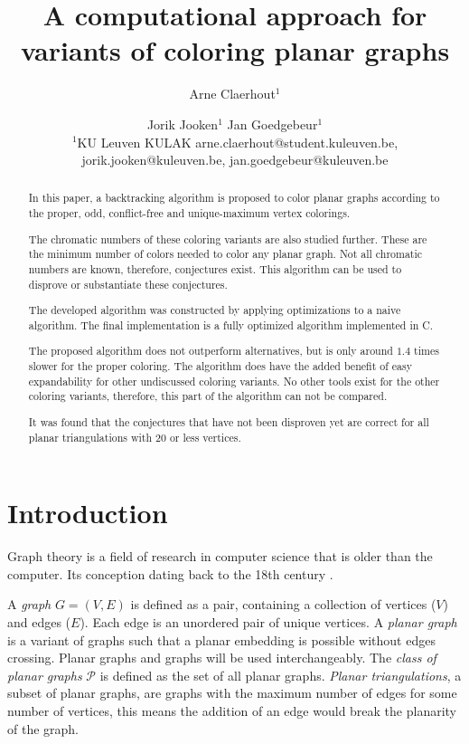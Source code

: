 \documentclass{article}
\title{A computational approach for variants of coloring planar graphs}
\author{
	Arne Claerhout$^1$\and
	Jorik Jooken$^1$\And
	Jan Goedgebeur$^1$\\
	\affiliations
	$^1$KU Leuven KULAK
	\emails
	arne.claerhout@student.kuleuven.be,
	jorik.jooken@kuleuven.be,
	jan.goedgebeur@kuleuven.be
}
\begin{document}
	
\maketitle

\begin{abstract}
	In this paper, a backtracking algorithm is proposed to color planar graphs according to the proper, odd, conflict-free and unique-maximum vertex colorings.
	
	The chromatic numbers of these coloring variants are also studied further. These are the minimum number of colors needed to color any planar graph.
	Not all chromatic numbers are known, therefore, conjectures exist. This algorithm can be used to disprove or substantiate these conjectures.
	
	The developed algorithm was constructed by applying optimizations to a naive algorithm. The final implementation is a fully optimized algorithm implemented in C.
	
	The proposed algorithm does not outperform alternatives, but is only around $1.4$ times slower for the proper coloring. The algorithm does have the added benefit of easy expandability for other undiscussed coloring variants. No other tools exist for the other coloring variants, therefore, this part of the algorithm can not be compared.
	
	It was found that the conjectures that have not been disproven yet are correct for all planar triangulations with $20$ or less vertices. 
	
\end{abstract}

\section{Introduction}

Graph theory is a field of research in computer science that is older than the computer. Its conception dating back to the 18th century \cite{euler1741solutio}. 

A \textit{graph} $G = (V, E)$ is defined as a pair, containing a collection of vertices ($V$) and edges ($E$). Each edge is an unordered pair of unique vertices. A \textit{planar graph} is a variant of graphs such that a planar embedding is possible without edges crossing. Planar graphs and graphs will be used interchangeably. The \textit{class of planar graphs} $\mathcal{P}$ is defined as the set of all planar graphs. \textit{Planar triangulations}, a subset of planar graphs, are graphs with the maximum number of edges for some number of vertices, this means the addition of an edge would break the planarity of the graph.
\end{document}
